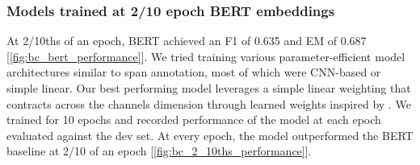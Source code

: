 
\subsubsection{Models trained at 2/10 epoch BERT embeddings}

At 2/10ths of an epoch, BERT achieved an F1 of 0.635 and EM of 0.687 [\ref{fig:bc_bert_performance}]. We tried training various parameter-efficient model architectures similar to span annotation, most of which were CNN-based or simple linear. Our best performing model leverages a simple linear weighting that contracts across the channels dimension through learned weights inspired by \cite{Tenney2020}. We trained for 10 epochs and recorded performance of the model at each epoch evaluated against the dev set. At every epoch, the model outperformed the BERT baseline at 2/10 of an epoch [\ref{fig:bc_2_10ths_performance}].

